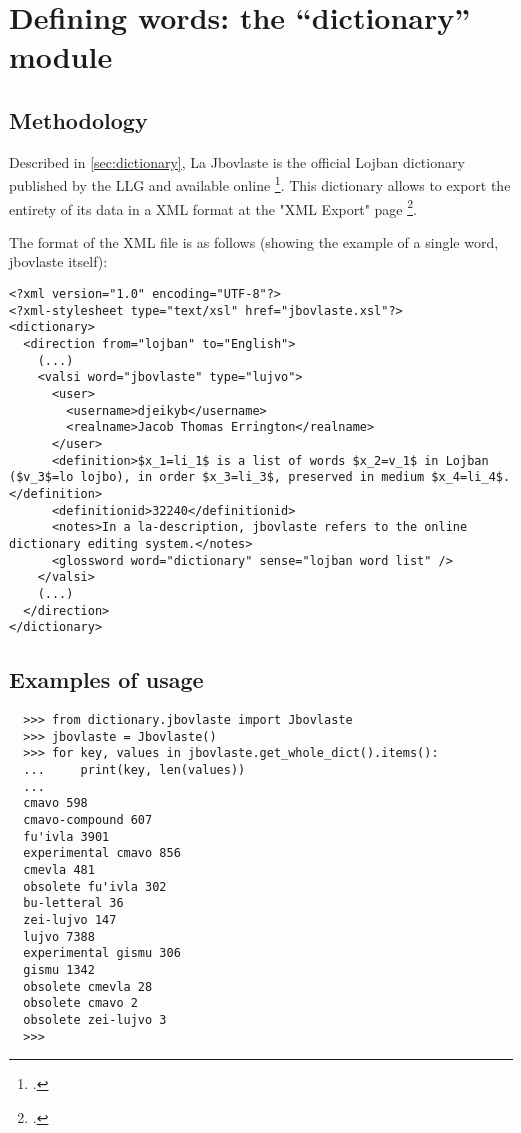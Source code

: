\chapter{Defining words: the ``dictionary'' module}
\label{chap:creating_a_dictionary}

\section{Methodology}

Described in \ref{sec:dictionary}, La Jbovlaste is the official Lojban dictionary published by the LLG and available online \footcite{jbovlaste}.
This dictionary allows to export the entirety of its data in a XML format at the "XML Export" page \footcite{jbovlaste-export}.\\

\newpage

The format of the XML file is as follows (showing the example of a single word, jbovlaste itself): \\

\begin{lstlisting}
<?xml version="1.0" encoding="UTF-8"?>
<?xml-stylesheet type="text/xsl" href="jbovlaste.xsl"?>
<dictionary>
  <direction from="lojban" to="English">
    (...)
    <valsi word="jbovlaste" type="lujvo">
      <user>
        <username>djeikyb</username>
        <realname>Jacob Thomas Errington</realname>
      </user>
      <definition>$x_1=li_1$ is a list of words $x_2=v_1$ in Lojban ($v_3$=lo lojbo), in order $x_3=li_3$, preserved in medium $x_4=li_4$.</definition>
      <definitionid>32240</definitionid>
      <notes>In a la-description, jbovlaste refers to the online dictionary editing system.</notes>
      <glossword word="dictionary" sense="lojban word list" />
    </valsi>
    (...)
  </direction>
</dictionary>
\end{lstlisting}

\section{Examples of usage}

\begin{lstlisting}
  >>> from dictionary.jbovlaste import Jbovlaste
  >>> jbovlaste = Jbovlaste()
  >>> for key, values in jbovlaste.get_whole_dict().items():
  ...     print(key, len(values))
  ...
  cmavo 598
  cmavo-compound 607
  fu'ivla 3901
  experimental cmavo 856
  cmevla 481
  obsolete fu'ivla 302
  bu-letteral 36
  zei-lujvo 147
  lujvo 7388
  experimental gismu 306
  gismu 1342
  obsolete cmevla 28
  obsolete cmavo 2
  obsolete zei-lujvo 3
  >>>
  \end{lstlisting}

